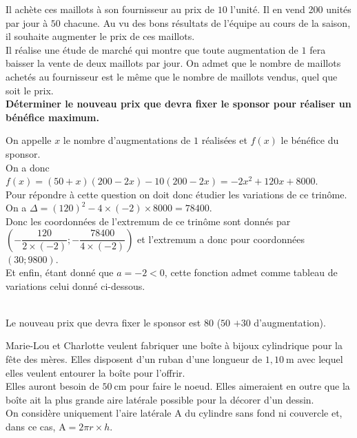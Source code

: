 \documentclass[12pt,a4paper]{article}  %
\begin{document}
Il achète ces maillots à son fournisseur au prix de $10$ \EUR{} l'unité. Il en vend 200 unités par jour à $50$ \EUR{} chacune. Au vu des bons résultats de l'équipe au cours de la saison, il souhaite augmenter le prix de ces maillots.\\

Il réalise une étude de marché qui montre que toute augmentation de $1$ \EUR{} fera baisser la vente de deux maillots par jour. On admet que le nombre de maillots achetés au fournisseur est le même que le nombre de maillots vendus, quel que soit le prix.\\

\textbf{Déterminer le nouveau prix que devra fixer le sponsor pour réaliser un bénéfice maximum.}

\begin{corrBox}
    On appelle $x$ le nombre d'augmentations de $1$\EUR{} réalisées et $f(x)$ le bénéfice du sponsor.\\
    On a donc $f(x)=(50+x)(200-2 x)-10(200-2 x)=-2 x^{2}+120 x+8000$. \\
    Pour répondre à cette question on doit donc étudier les variations de ce trinôme.\\
    On a $\Delta=(120)^{2}-4 \times(-2) \times 8000=78400$.\\
    Donc les coordonnées de l'extremum de ce trinôme sont donnés par $\left(-\dfrac{120}{2 \times(-2)} ;-\dfrac{78400}{4 \times(-2)}\right)$ et l'extremum a donc pour coordonnées $(30 ; 9800)$. \\
    Et enfin, étant donné que $a=-2<0$, cette fonction admet comme tableau de variations celui donné ci-dessous.\\
    \\
    Le nouveau prix que devra fixer le sponsor est $80$\EUR{} ($50$\EUR{} $+30$ \EUR{} d'augmentation).
\end{corrBox}

Marie-Lou et Charlotte veulent fabriquer une boîte à bijoux cylindrique pour la fête des mères. Elles disposent d'un ruban d'une longueur de $1,10 \mathrm{~m}$ avec lequel elles veulent entourer la boîte pour l'offrir.\\

Elles auront besoin de $50 \mathrm{~cm}$ pour faire le noeud. Elles aimeraient en outre que la boîte ait la plus grande aire latérale possible pour la décorer d'un dessin.\\
On considère uniquement l'aire latérale A du cylindre sans fond ni couvercle et, dans ce cas, $\mathrm{A}=2 \pi r \times h$.\\
\end{document}

